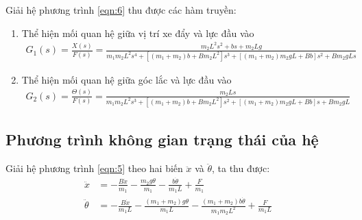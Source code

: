 \documentclass[12pt,a4paper]{article}
\begin{document}
Giải hệ phương trình \eqref{eqn:6} thu được các hàm truyền:
\begin{enumerate}
    \item Thể hiện mối quan hệ giữa vị trí xe đẩy và lực đầu vào
    {\footnotesize	
    \begin{align}
        G_1(s)=\frac{X(s)}{F(s)} = \frac{m_2L^2s^2 + bs + m_2Lg}{m_1 m_2 L^2 s^4 + [(m_1 + m_2)b + B m_2 L^2] s^3 + [(m_1 + m_2)m_2 g L + B b] s^2 + B m_2 g L s}
    \end{align}}
    \item Thể hiện mối quan hệ giữa góc lắc và lực đầu vào
    {\footnotesize	
    \begin{align}
        G_2(s)=\frac{\Theta(s)}{F(s)} = \frac{m_2Ls}{m_1 m_2 L^2 s^3 + [(m_1 + m_2)b + B m_2 L^2] s^2 + [(m_1 + m_2)m_2 g L + B b] s + B m_2 g L}
    \end{align}}
\end{enumerate}

\subsection{Phương trình không gian trạng thái của hệ}
Giải hệ phương trình \eqref{eqn:5} theo hai biến $\ddot x$ và $\ddot \theta$, ta thu được:
\begin{align}
    \ddot x & = -\frac{B\dot x}{m_1} - \frac{m_2g\theta}{m_1} - \frac{b\dot\theta}{m_1L} + \frac{F}{m_1}\label{eqn:9}\\
    \ddot \theta & = -\frac{B\dot x}{m_1 L} - \frac{(m_1+m_2)g\theta}{m_1L} - \frac{(m_1+m_2)b\dot\theta}{m_1m_2L^2}+ \frac{F}{m_1L} \label{eqn:10}
\end{align}
\end{document}
